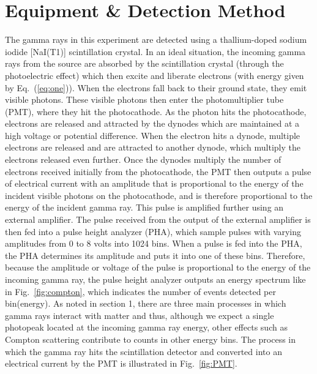 \documentclass[%
 aip,
rsi,%
 amsmath,amssymb,
 reprint,%
author-numerical,%
]{revtex4-1}
\begin{document}
\section{Equipment \& Detection Method}
The gamma rays in this experiment are detected using a thallium-doped sodium iodide [NaI(T1)] scintillation crystal. In an ideal situation, the incoming gamma rays from the source are absorbed by the scintillation crystal (through the photoelectric effect) which then excite and liberate electrons (with energy given by Eq.~(\ref{eq:one})). When the electrons fall back to their ground state, they emit visible photons. These visible photons then enter the photomultiplier tube (PMT), where they hit the photocathode. As the photon hits the photocathode, electrons are released and attracted by the dynodes which are maintained at a high voltage or potential difference. When the electron hits a dynode, multiple electrons are released and are attracted to another dynode, which multiply the electrons released even further. \cite{detectors} Once the dynodes multiply the number of electrons received initially from the photocathode, the PMT then outputs a pulse of electrical current with an amplitude that is proportional to the energy of the incident visible photons on the photocathode, and is therefore proportional to the energy of the incident gamma ray. \newline
\indent This pulse is amplified further using an external amplifier. The pulse received from the output of the external amplifier is then fed into a pulse height analyzer (PHA), which sample pulses with varying amplitudes from 0 to 8 volts into 1024 bins. When a pulse is fed into the PHA, the PHA determines its amplitude and puts it into one of these bins. Therefore, because the amplitude or voltage of the pulse is proportional to the energy of the incoming gamma ray, the pulse height analyzer outputs an energy spectrum like in  Fig.~\ref{fig:compton}, which indicates the number of events detected per bin(energy). \newline
\indent As noted in section 1, there are three main processes in which gamma rays interact with matter and thus, although we expect a single photopeak located at the incoming gamma ray energy, other effects such as Compton scattering contribute to counts in other energy bins. The process in which the gamma ray hits the scintillation detector and converted into an electrical current by the PMT is illustrated in Fig.~\ref{fig:PMT}.
\end{document}
